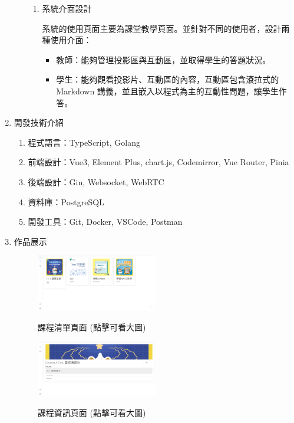 \documentclass[12pt]{article}
\begin{document}
\begin{enumerate}
\begin{enumerate}
\begin{enumerate}[label=(\arabic*)]
          \item 系統介面設計
            \par 系統的使用頁面主要為課堂教學頁面。並針對不同的使用者，設計兩種使用介面：
            \begin{itemize}
              \item 教師：能夠管理投影區與互動區，並取得學生的答題狀況。
              \item 學生：能夠觀看投影片、互動區的內容，互動區包含滾拉式的 Markdown 講義，並且嵌入以程式為主的互動性問題，讓學生作答。
            \end{itemize}
          \end{enumerate}  
    \end{enumerate}
  \item 開發技術介紹
    \begin{enumerate}[label=(\arabic*)]
      \setlength{\parindent}{2em}
      \item 程式語言：TypeScript, Golang
      \item 前端設計：Vue3, Element Plus, chart.js, Codemirror, Vue Router, Pinia   
      \item 後端設計：Gin, Websocket, WebRTC
      \item 資料庫：PostgreSQL
      \item 開發工具：Git, Docker, VSCode, Postman
    \end{enumerate}
  
  \item 作品展示
    \begin{figure}[H]
      \centering
      \href{https://raw.githubusercontent.com/programingtw/proglearn-plan/main/img/list.png}{ 
        \includegraphics[width=0.5\textwidth]{./img/list.png}
      }
      \caption{課程清單頁面 (點擊可看大圖)}
      \label{arc6}
    \end{figure}

    \begin{figure}[H]
      \centering
      \href{https://raw.githubusercontent.com/programingtw/proglearn-plan/main/img/course.png}{ 
        \includegraphics[width=0.5\textwidth]{./img/course.png}
      }
      \caption{課程資訊頁面 (點擊可看大圖)}
      \label{arc7}
    \end{figure}


\end{enumerate}
\end{document}
